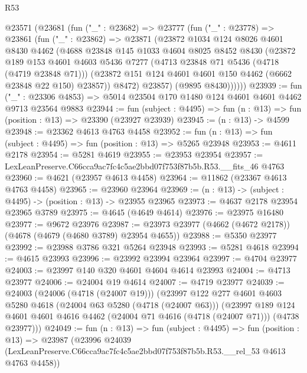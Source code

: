 \begin{lexlean}{R53}
\begin{coremodule}
    @23571
      (@23681
        (fun ("_" : @23682) =>
        @23777
          (fun ("_" : @23778) =>
          @23861
            (fun ("_" : @23862) =>
            @23871
              (@23872
                @1034
                @124
                @8026
                @4601
                @8430
                @4462
                (@4688
                  @23848
                  @145
                  @1033
                  @4604
                  @8025
                  @8452
                  @8430
                  (@23872
                    @189
                    @153
                    @4601
                    @4603
                    @5436
                    @7277
                    (@4713 @23848 @71 @5436 (@4718 (@4719 @23848 @71)))
                    (@23872 @151 @124 @4601 @4601 @150 @4462 (@6662 @23848 @22 @150) @23857))
                  @8472)
                @23857)
              (@9895 @8430))))))
@23939 := fun ("_" : @23306 @4853) =>
  @5014 @23504 @170 @1480 @124 @4601 @4601 @4462 @9713 @23564 @9883
@23944 := fun (subject : @4495) => fun (n : @13) => fun (position : @13) => @23390 (@23927 @23939)
@23945 := (n : @13) -> @4599
@23948 := @23362 @4613 @4763 @4458
@23952 := fun (n : @13) => fun (subject : @4495) => fun (position : @13) => @5265 @23948
@23953 := @4611 @2178
@23954 := @5281 @4619
@23955 := @23953 @23954
@23957 := LexLeanPreserve.C66cca9ac7fc4c5ae2bbd07f753f87b5b.R53.__fits_46 @4763
@23960 := @4621 (@23957 @4613 @4458)
@23964 := @11862 (@23367 @4613 @4763 @4458)
@23965 := @23960 @23964
@23969 := (n : @13) -> (subject : @4495) -> (position : @13) -> @23955 @23965
@23973 := @4637 @2178 @23954 @23965 @3789
@23975 := @4645 (@4649 @4614)
@23976 := @23975 @16480
@23977 := @9672 @23976
@23987 := @23973 @23977 (@4662 (@4672 @2178)) (@4678 (@4679 (@4680 @3789) @23954 @4655))
@23988 := @5350 @23977
@23992 := @23988 @3786 @321 @5264 @23948
@23993 := @5281 @4618
@23994 := @4615 @23993
@23996 := @23992 @23994 @23964
@23997 := @4704 @23977
@24003 := @23997 @140 @320 @4601 @4604 @4614 @23993
@24004 := @4713 @23977
@24006 := @24004 @19 @4614
@24007 := @4719 @23977
@24039 := @24003
    (@24006 (@4718 (@24007 @19)))
    (@23997
      @122
      @277
      @4601
      @4603
      @5280
      @4618
      (@24004 @63 @5280 (@4718 (@24007 @63)))
      (@23997
        @189
        @124
        @4601
        @4601
        @4616
        @4462
        (@24004 @71 @4616 (@4718 (@24007 @71)))
        (@4738 @23977)))
@24049 := fun (n : @13) =>
  fun (subject : @4495) =>
  fun (position : @13) =>
  @23987
    (@23996
      @24039
      (LexLeanPreserve.C66cca9ac7fc4c5ae2bbd07f753f87b5b.R53.__rel_53 @4613 @4763 @4458))

\end{coremodule}
\end{lexlean}

